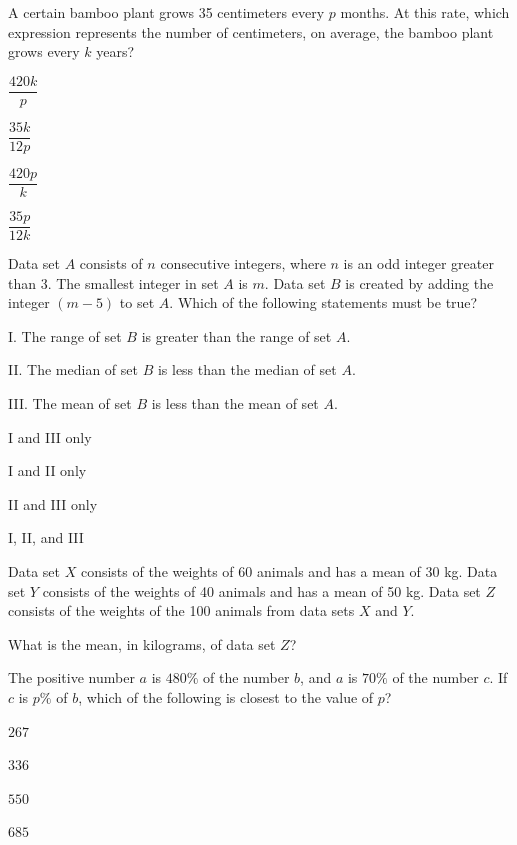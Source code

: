 \vfill
\clearpage
\noindent\begin{minipage}{\linewidth}
\par\smallskip
A certain bamboo plant grows 35 centimeters every $p$ months. At this rate, which expression represents the number of centimeters, on average, the bamboo plant grows every $k$ years?
\begin{satchoices}
  \item[A)] $\dfrac{420k}{p}$
  \item[B)] $\dfrac{35k}{12p}$
  \item[C)] $\dfrac{420p}{k}$
  \item[D)] $\dfrac{35p}{12k}$
\end{satchoices}
\end{minipage}
\vfill
\noindent\begin{minipage}{\linewidth}
\par\smallskip
Data set $A$ consists of $n$ consecutive integers, where $n$ is an odd integer greater than 3. The smallest integer in set $A$ is $m$. Data set $B$ is created by adding the integer $(m-5)$ to set $A$. Which of the following statements must be true?\par\smallskip I. The range of set $B$ is greater than the range of set $A$.\par II. The median of set $B$ is less than the median of set $A$.\par III. The mean of set $B$ is less than the mean of set $A$.
\begin{satchoices}
  \item[A)] I and III only
  \item[B)] I and II only
  \item[C)] II and III only
  \item[D)] I, II, and III
\end{satchoices}
\end{minipage}
\vfill
\noindent\begin{minipage}{\linewidth}
\par\smallskip
Data set $X$ consists of the weights of 60 animals and has a mean of 30 kg. Data set $Y$ consists of the weights of 40 animals and has a mean of 50 kg. Data set $Z$ consists of the weights of the 100 animals from data sets $X$ and $Y$.\par\smallskip What is the mean, in kilograms, of data set $Z$?
\end{minipage}
\vfill
\clearpage
\noindent\begin{minipage}{\linewidth}
\par\smallskip
The positive number $a$ is $480\%$ of the number $b$, and $a$ is $70\%$ of the number $c$. If $c$ is $p\%$ of $b$, which of the following is closest to the value of $p$?
\begin{satchoices}
  \item[A)] $267$
  \item[B)] $336$
  \item[C)] $550$
  \item[D)] $685$
\end{satchoices}
\end{minipage}
